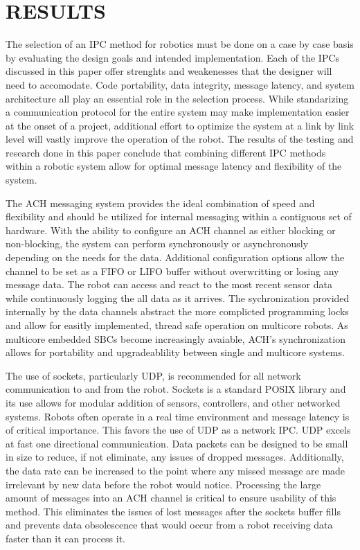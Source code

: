 \section{RESULTS}

The selection of an IPC method for robotics must be done on a case by case basis by evaluating the design goals and intended implementation. Each of the IPCs discussed in this paper offer strenghts and weakenesses that the designer will need to accomodate. Code portability, data integrity, message latency, and system architecture all play an essential role in the selection process. While standarizing a communication protocol for the entire system may make implementation easier at the onset of a project, additional effort to optimize the system at a link by link level will vastly improve the operation of the robot. The results of the testing and research done in this paper conclude that combining different IPC methods within a robotic system allow for optimal message latency and flexibility of the system.

The ACH messaging system provides the ideal combination of speed and flexibility and should be utilized for internal messaging within a contiguous set of hardware. With the ability to configure an ACH channel as either blocking or non-blocking, the system can perform synchronously or asynchronously depending on the needs for the data. Additional configuration options allow the channel to be set as a FIFO or LIFO buffer without overwritting or losing any message data. The robot can access and react to the most recent sensor data while continuously logging the all data as it arrives. The sychronization provided internally by the data channels abstract the more complicted programming locks and allow for easitly implemented, thread safe operation on multicore robots. As multicore embedded SBCs become increasingly avaiable, ACH's synchronization allows for portability and upgradeablility between single and multicore systems.

The use of sockets, particularly UDP, is recommended for all network communication to and from the robot. Sockets is a standard POSIX library and its use allows for modular addition of sensors, controllers, and other networked systems. Robots often operate in a real time environment and message latency is of critical importance. This favors the use of UDP as a network IPC. UDP excels at fast one directional communication. Data packets can be designed to be small in size to reduce, if not eliminate, any issues of dropped messages. Additionally, the data rate can be increased to the point where any missed message are made irrelevant by new data before the robot would notice. Processing the large amount of messages into an ACH channel is critical to ensure usability of this method. This eliminates the issues of lost messages after the sockets buffer fills and prevents data obsolescence that would occur from a robot receiving data faster than it can process it.

